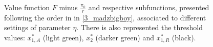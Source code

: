 \begin{figure}[!htb]
	\begin{subfigmatrix}{6}
	\end{subfigmatrix}
	\caption{Value function $F$ minus $\frac{\pi_0}{r}$ and respective subfunctions, presented following the order in in \eqref{3_madzbigboy}, associated to different settings of parameter $\eta$. There is also represented the threshold values: $x^*_{1,A}$ (light green),  $x^*_2$ (darker green) and $x^*_{1,R}$ (black). }
	\label{fig:3_F}
\end{figure}

